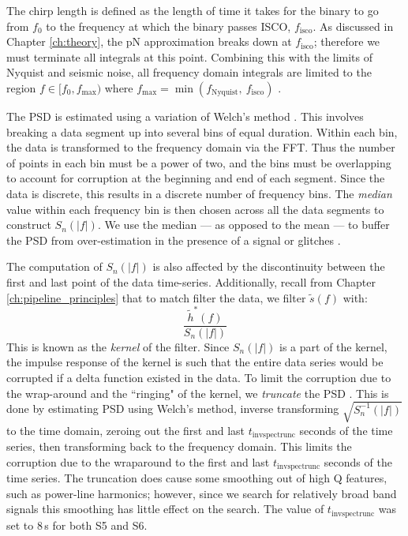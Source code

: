 The chirp length is defined as the length of time it takes for the binary to go
from $f_0$ to the frequency at which the binary passes \ac{ISCO},
$f_{\mathrm{isco}}$. As discussed in Chapter \ref{ch:theory}, the \ac{pN}
approximation breaks down at $f_{\mathrm{isco}}$; therefore we must terminate
all integrals at this point. Combining this with the limits of Nyquist and
seismic noise, all frequency domain integrals are limited to the region $f \in
[f_0, f_{\mathrm{max}})$ where $f_{\mathrm{max}} =
\min(f_{\mathrm{Nyquist}},~f_{\mathrm{isco}})$ \cite{Brown}.

The \ac{PSD} is estimated using a variation of Welch's method \cite{Brown}.
This involves breaking a data segment up into several bins of equal duration.
Within each bin, the data is transformed to the frequency domain via the
\ac{FFT}. Thus the number of points in each bin must be a power of two, and the
bins must be overlapping to account for corruption at the beginning and end of
each segment. Since the data is discrete, this results in a discrete number of
frequency bins. The \emph{median} value within each frequency bin is then
chosen across all the data segments to construct $S_n(|f|)$. We use the median
--- as opposed to the mean --- to buffer the \ac{PSD} from over-estimation in
the presence of a signal or glitches \cite{Brown}.

The computation of $S_n(|f|)$ is also affected by the discontinuity between the
first and last point of the data time-series. Additionally, recall from Chapter
\ref{ch:pipeline_principles} that to match filter the data, we filter
$\widetilde{s}(f)$ with:
\begin{equation*}
\frac{\widetilde{h}^{*}(f)}{S_n(|f|)}
\end{equation*}
This is known as the \emph{kernel} of the filter. Since $S_n(|f|)$ is a part of
the kernel, the impulse response of the kernel is such that the entire data
series would be corrupted if a delta function existed in the data. To limit the
corruption due to the wrap-around and the ``ringing" of the kernel, we
\emph{truncate} the \ac{PSD} \cite{Brown}. This is done by estimating \ac{PSD}
using Welch's method, inverse transforming $\sqrt{S_n^{-1}(|f|)}$ to the time
domain, zeroing out the first and last $t_{\mathrm{invspectrunc}}$ seconds of
the time series, then transforming back to the frequency domain. This limits
the corruption due to the wraparound to the first and last
$t_{\mathrm{invspectrunc}}$ seconds of the time series. The truncation does
cause some smoothing out of high Q features, such as power-line harmonics;
however, since we search for relatively broad band signals this smoothing has
little effect on the search. The value of $t_{\mathrm{invspectrunc}}$ was set
to $8\,$s for both \ac{S5} and \ac{S6}.

